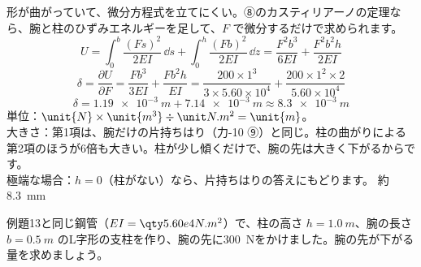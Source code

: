 \begin{phreidai}
\begin{bkfigure}
\label{ph:力-11:fig-Lbmd}
\end{bkfigure}
\phriyu
形が曲がっていて、微分方程式を立てにくい。⑧のカスティリアーノの定理なら、腕と柱のひずみエネルギーを足して、$F$ で微分するだけで求められます。
\phtateru
\[ U=\int_0^b\frac{(Fs)^2}{2EI}\,\dd s+\int_0^h\frac{(Fb)^2}{2EI}\,\dd z=\frac{F^2b^3}{6EI}+\frac{F^2b^2h}{2EI} \]
\phtoku
\[ \delta=\frac{\partial U}{\partial F}=\frac{Fb^3}{3EI}+\frac{Fb^2h}{EI}=\frac{200\times1^3}{3\times5.60\times10^4}+\frac{200\times1^2\times2}{5.60\times10^4} \]
\[ \delta=\qty{1.19e-3}{m}+\qty{7.14e-3}{m}\approx\qty{8.3e-3}{m} \]
\phtashikame
単位：$\unit{N}\times\unit{m^3}\div\pxlu{N.m^2}=\unit{m}$。\\
大きさ：第1項は、腕だけの片持ちはり（力-10 ⑨）と同じ。柱の曲がりによる第2項のほうが6倍も大きい。柱が少し傾くだけで、腕の先は大きく下がるからです。\\
極端な場合：$h=0$（柱がない）なら、片持ちはりの答えにもどります。
\kotae 約\qty{8.3}{mm}
\end{phreidai}
\begin{jibun}
例題13と同じ鋼管（$EI=\pxlq{5.60e4}{N.m^2}$）で、柱の高さ $h=\qty{1.0}{m}$、腕の長さ $b=\qty{0.5}{m}$ のL字形の支柱を作り、腕の先に\qty{300}{N}をかけました。腕の先が下がる量を求めましょう。
\end{jibun}

